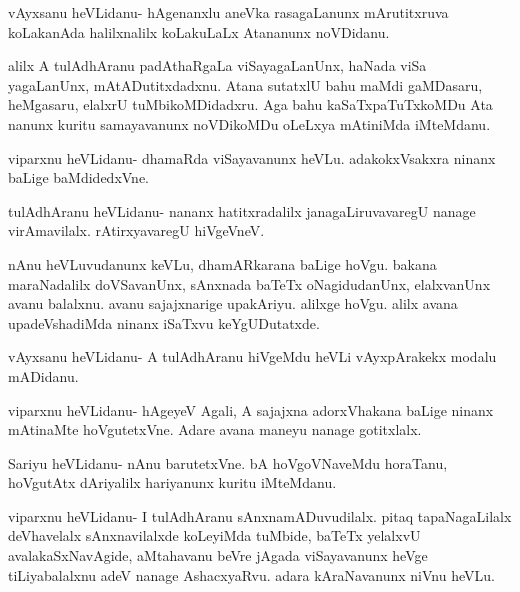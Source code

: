 \documentclass{article}
\begin{document}
\begin{mng}%
vAyxsanu heVLidanu- hAgenanxlu aneVka rasagaLanunx mArutitxruva
koLakanAda halilxnalilx koLakuLaLx Atananunx noVDidanu.
\end{mng}

\begin{mng}%
alilx A tulAdhAranu padAthaRgaLa viSayagaLanUnx, haNada viSa
yagaLanUnx, mAtADutitxdadxnu. Atana sutatxlU bahu maMdi gaMDasaru,
heMgasaru, elalxrU tuMbikoMDidadxru. Aga bahu kaSaTxpaTuTxkoMDu Ata
nanunx kuritu samayavanunx noVDikoMDu oLeLxya mAtiniMda iMteMdanu.
\end{mng}

\begin{mng}%
viparxnu heVLidanu- dhamaRda viSayavanunx heVLu. adakokxVsakxra 
ninanx baLige baMdidedxVne.
\end{mng}

\begin{mng}%
tulAdhAranu heVLidanu- nananx hatitxradalilx janagaLiruvavaregU
nanage virAmavilalx. rAtirxyavaregU hiVgeVneV.
\end{mng}

\begin{mng}%
nAnu heVLuvudanunx keVLu, dhamARkarana baLige hoVgu.
bakana maraNadalilx doVSavanUnx, sAnxnada baTeTx oNagidudanUnx, elalxvanUnx
avanu balalxnu. avanu sajajxnarige upakAriyu. alilxge hoVgu. alilx avana
upadeVshadiMda ninanx iSaTxvu keYgUDutatxde.
\end{mng}

\begin{mng}%
vAyxsanu heVLidanu- A tulAdhAranu hiVgeMdu heVLi vAyxpArakekx 
modalu mADidanu.
\end{mng}

\begin{mng}%
viparxnu heVLidanu- hAgeyeV Agali, A sajajxna adorxVhakana
baLige ninanx mAtinaMte hoVgutetxVne. Adare avana maneyu nanage gotitxlalx.
\end{mng}

\begin{mng}%
Sariyu heVLidanu- nAnu barutetxVne. bA hoVgoVNaveMdu
horaTanu, hoVgutAtx dAriyalilx hariyanunx kuritu iMteMdanu.
\end{mng}

\begin{mng}%
viparxnu heVLidanu- I tulAdhAranu sAnxnamADuvudilalx.
pitaq tapaNagaLilalx deVhavelalx sAnxnavilalxde koLeyiMda tuMbide, baTeTx
yelalxvU avalakaSxNavAgide, aMtahavanu beVre jAgada viSayavanunx heVge
tiLiyabalalxnu adeV nanage AshacxyaRvu. adara kAraNavanunx niVnu heVLu.
\end{mng}
\end{document}

